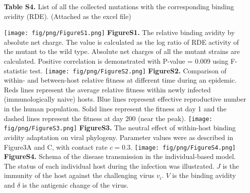 \documentclass[12pt,a4paper]{article}
\begin{document}
{\bf Table S4.} List of all the collected mutations with the corresponding binding avidity (RDE). (Attached as the excel file)
\clearpage



\texttt{[image: fig/png/FigureS1.png]}
{\bf FigureS1.} The relative binding avidity by absolute net charge. The value is calculated as the log ratio of RDE activity of the mutant to the wild type. Absolute net charges of all the mutant strains are calculated. Positive correlation is demonstrated with P-value = 0.009 using F-statistic test.
\clearpage
\texttt{[image: fig/png/FigureS2.png]}
{\bf FigureS2.}  Comparison of within- and between-host relative fitness at different time during an epidemic. Reds lines represent the average relative fitness within newly infected (immunologically naive) hosts. Blue lines represent effective reproductive number in the human population. Solid lines represent the fitness at day 1 and the dashed lines represent the fitness at day 200 (near the peak).
\clearpage
\texttt{[image: fig/png/FigureS3.png]}
{\bf FigureS3.} The neutral effect of within-host binding avidity adaptation on viral phylogeny. Parameter values were as described in Figure3A and C, with contact rate $c=0.3$.
\clearpage
\texttt{[image: fig/png/FigureS4.png]}
{\bf FigureS4.}  Schema of the disease transmission in the individual-based model. The status of each individual host during the infection was illustrated. $J$ is the immunity of the host against the challenging virus $v_{i}$. $V$ is the binding avidity and $\delta$ is the antigenic change of the virus. 
\clearpage



\clearpage
\end{document}
